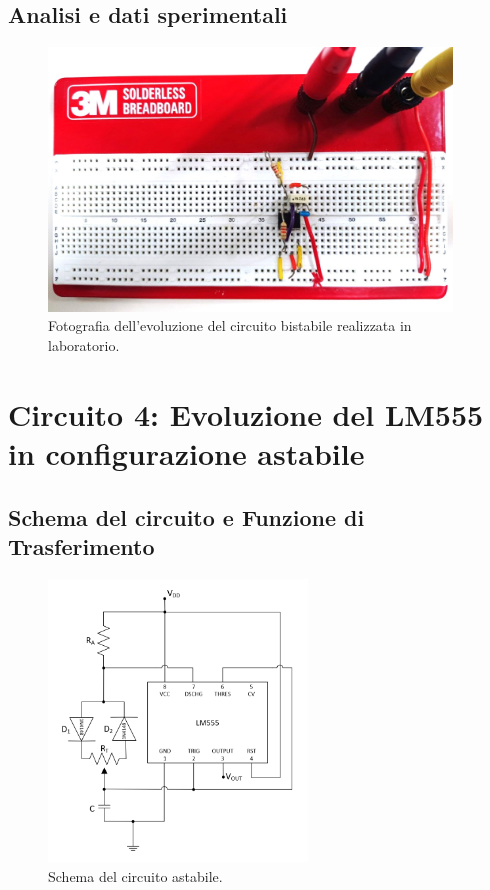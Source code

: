 \documentclass{report}
\begin{document}
\subsection{Analisi e dati sperimentali}
\begin{figure}[h!]
	\centering
	\includegraphics[height=7cm]{immagini/circuito3}
	\caption{Fotografia dell'evoluzione del circuito bistabile realizzata in laboratorio.}
	\label{figura:circuito3}
\end{figure}

\newpage
\section{Circuito 4: Evoluzione del LM555 in configurazione astabile}
\subsection{Schema del circuito e Funzione di Trasferimento}
\begin{figure}[h!]
	\centering
	\includegraphics[height=7.5cm]{immagini/schema4}
	\caption{Schema del circuito astabile.}
	\label{figura:schema4}
\end{figure}
\end{document}
